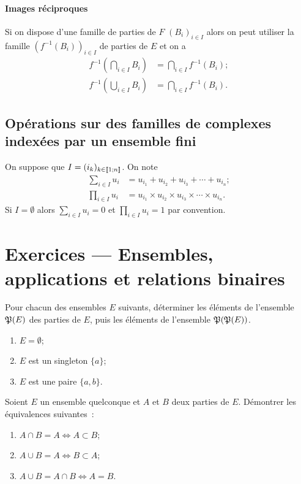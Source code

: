 \paragraph{Images réciproques}
\label{chap3-par:imagerec}

Si on dispose d'une famille de parties de \(F\) \((B_i)_{i \in I}\) alors on 
peut utiliser la famille \((f^{-1}(B_i))_{i \in I}\) de parties de \(E\) et on a
\begin{align}
    f^{-1} \left(\bigcap\limits_{i \in I} B_i\right) &= \bigcap\limits_{i \in I} 
    f^{-1}(B_i);\\
    f^{-1} \left(\bigcup\limits_{i \in I} B_i\right) &= \bigcap\limits_{i \in I} 
    f^{-1}(B_i).
\end{align}

\subsection{Opérations sur des familles de complexes indexées par un ensemble 
fini}
\label{chap3-subsec:operationsfamilles}
On suppose que \(I=(i_k)_{k \in  \mathopen{\llbracket}1\mathclose{}\mathpunct{};n\mathclose{\rrbracket}}\). On note 
\begin{align}
    \sum_{i \in I} u_i &= u_{i_1} +u_{i_2} +u_{i_3} + \dotsb +u_{i_n};\\
    \prod_{i \in I} u_i &= u_{i_1} \times u_{i_2} \times u_{i_3} \times \dotsm 
    \times u_{i_n}.
\end{align}
Si \(I=\emptyset\) alors \(\sum_{i \in I} u_i=0\) et \(\prod_{i \in I} u_i=1\) par convention.

\section{Exercices --- Ensembles, applications et relations binaires}

\begin{exercice}
    Pour chacun des ensembles \(E\) suivants, déterminer les éléments de 
    l'ensemble \(\mathfrak{P}(E)\) des parties de \(E\), puis les éléments de 
    l'ensemble \(\mathfrak{P}(\mathfrak{P}(E))\).
    \begin{enumerate}
        \item \(E=\emptyset\);
        \item \(E\) est un singleton \(\{a\}\);
        \item \(E\) est une paire \(\{a, b\}\).
    \end{enumerate}
\end{exercice}

\begin{exercice}
    Soient \(E\) un ensemble quelconque et \(A\) et \(B\) deux parties de \(E\). 
    Démontrer les équivalences suivantes~:
    \begin{enumerate}
        \item \(A \cap B = A \iff A \subset B \);
        \item \(A \cup B = A \iff B \subset A \);
        \item \(A \cup B = A \cap B \iff A = B \).
    \end{enumerate}
\end{exercice}

